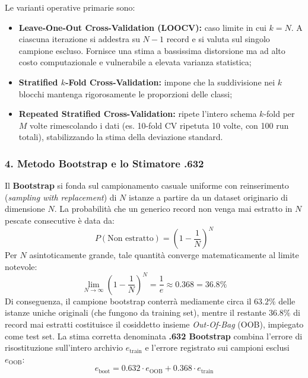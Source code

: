 Le varianti operative primarie sono:
\begin{itemize}
    \item \textbf{Leave-One-Out Cross-Validation (LOOCV):} caso limite in cui $k = N$. A ciascuna iterazione si addestra su $N - 1$ record e si valuta sul singolo campione escluso. Fornisce una stima a bassissima distorsione ma ad alto costo computazionale e vulnerabile a elevata varianza statistica;
    \item \textbf{Stratified $k$-Fold Cross-Validation:} impone che la suddivisione nei $k$ blocchi mantenga rigorosamente le proporzioni delle classi;
    \item \textbf{Repeated Stratified Cross-Validation:} ripete l'intero schema $k$-fold per $M$ volte rimescolando i dati (es. 10-fold CV ripetuta 10 volte, con 100 run totali), stabilizzando la stima della deviazione standard.
\end{itemize}

\subsubsection{4. Metodo Bootstrap e lo Stimatore .632}
Il \textbf{Bootstrap} si fonda sul campionamento casuale uniforme con reinserimento (\textit{sampling with replacement}) di $N$ istanze a partire da un dataset originario di dimensione $N$.
La probabilità che un generico record non venga mai estratto in $N$ pescate consecutive è data da:
\begin{equation}
    P(\text{Non estratto}) = \left(1 - \frac{1}{N}\right)^N
\end{equation}
Per $N$ asintoticamente grande, tale quantità converge matematicamente al limite notevole:
\begin{equation}
    \lim_{N \to \infty} \left(1 - \frac{1}{N}\right)^N = \frac{1}{e} \approx 0.368 = 36.8\%
\end{equation}
Di conseguenza, il campione bootstrap conterrà mediamente circa il $63.2\%$ delle istanze uniche originali (che fungono da training set), mentre il restante $36.8\%$ di record mai estratti costituisce il cosiddetto insieme \textit{Out-Of-Bag} (OOB), impiegato come test set.
La stima corretta denominata \textbf{.632 Bootstrap} combina l'errore di risostituzione sull'intero archivio $e_{\text{train}}$ e l'errore registrato sui campioni esclusi $e_{\text{OOB}}$:
\begin{equation}
    e_{\text{boot}} = 0.632 \cdot e_{\text{OOB}} + 0.368 \cdot e_{\text{train}}
\end{equation}

